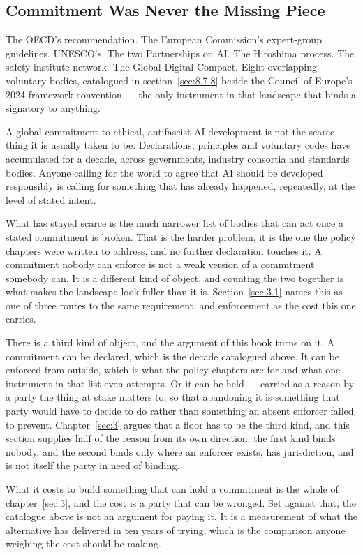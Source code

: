 \subsection{Commitment Was Never the Missing Piece}
\label{sec:10.1.2}
The OECD's recommendation. The European Commission's expert-group guidelines. UNESCO's. The two Partnerships on AI. The Hiroshima process. The safety-institute network. The Global Digital Compact. Eight overlapping voluntary bodies, catalogued in section~\ref{sec:8.7.8} beside the Council of Europe's 2024 framework convention — the only instrument in that landscape that binds a signatory to anything.

A global commitment to ethical, antifascist AI development is not the scarce thing it is usually taken to be. Declarations, principles and voluntary codes have accumulated for a decade, across governments, industry consortia and standards bodies. Anyone calling for the world to agree that AI should be developed responsibly is calling for something that has already happened, repeatedly, at the level of stated intent.

What has stayed scarce is the much narrower list of bodies that can act once a stated commitment is broken. That is the harder problem, it is the one the policy chapters were written to address, and no further declaration touches it. A commitment nobody can enforce is not a weak version of a commitment somebody can. It is a different kind of object, and counting the two together is what makes the landscape look fuller than it is. Section~\ref{sec:3.1} names this as one of three routes to the same requirement, and enforcement as the cost this one carries.

There is a third kind of object, and the argument of this book turns on it. A commitment can be declared, which is the decade catalogued above. It can be enforced from outside, which is what the policy chapters are for and what one instrument in that list even attempts. Or it can be held — carried as a reason by a party the thing at stake matters to, so that abandoning it is something that party would have to decide to do rather than something an absent enforcer failed to prevent. Chapter~\ref{sec:3} argues that a floor has to be the third kind, and this section supplies half of the reason from its own direction: the first kind binds nobody, and the second binds only where an enforcer exists, has jurisdiction, and is not itself the party in need of binding.

What it costs to build something that can hold a commitment is the whole of chapter~\ref{sec:3}, and the cost is a party that can be wronged. Set against that, the catalogue above is not an argument for paying it. It is a measurement of what the alternative has delivered in ten years of trying, which is the comparison anyone weighing the cost should be making.
